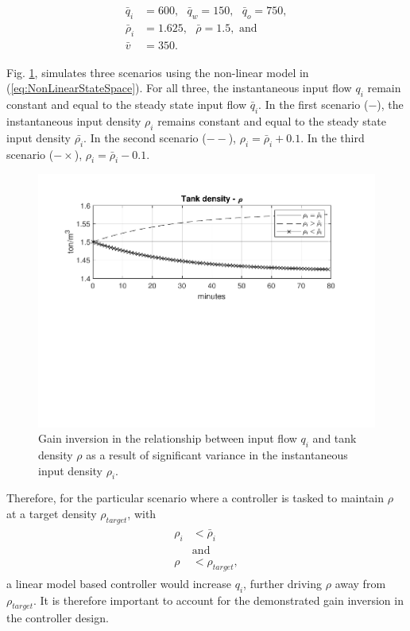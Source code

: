 \documentclass[preprint,authoryear,12pt]{elsarticle}
\begin{document}
\begin{align}
	\begin{split}
		\bar{q}_i &= 600, \text{  }\bar{q}_w = 150, \text{  }\bar{q}_o = 750, \\
		\bar{\rho}_i &= 1.625, \text{  }\bar{\rho} = 1.5, \text{ and }\\
		\bar{v} &= 350.
	\end{split}
\label{eq:GainInversionSimValues}
\end{align}

Fig. \ref{fig:GainInversion}, simulates three scenarios using the non-linear model in (\ref{eq:NonLinearStateSpace}). For all three, the instantaneous input flow $q_i$ remain constant and equal to the steady state input flow $\bar{q}_i$. In the first scenario ($-$), the instantaneous input density $\rho_i$ remains constant and equal to the steady state input density $\bar{\rho_i}$. In the second scenario ($--$), $\rho_i = \bar{\rho}_i + 0.1$. In the third scenario ($-\times$), $\rho_i = \bar{\rho}_i - 0.1$.

\begin{figure}[t!]
	\centering
	\includegraphics[trim={0.8cm, 5cm, 0.8cm, 0.8cm}, clip, width=5.2in]{gain_inversion.pdf}
	\caption{Gain inversion in the relationship between input flow $q_i$ and tank density $\rho$ as a result of significant variance in the instantaneous input density $\rho_i$.}
	\label{fig:GainInversion}
\end{figure}

Therefore, for the particular scenario where a controller is tasked to maintain $\rho$ at a target density $\rho_{target}$, with 
\begin{align}
	\begin{split}
	\rho_i &< \bar{\rho}_i \\
	&\text{and}\\
	\rho &< \rho_{target},
\end{split}
\label{eq:GainInversionScenario}
\end{align}
a linear model based controller would increase $q_i$, further driving $\rho$ away from $\rho_{target}$. It is therefore important to account for the demonstrated gain inversion in the controller design. 
\end{document}
